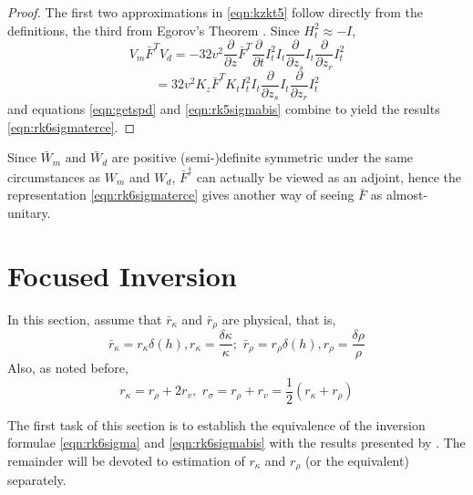 \begin{proof}
The first two approximations in \ref{eqn:kzkt5} follow directly from
the definitions, the third from Egorov's Theorem \cite[]{Tay:81}.
Since $H_t^2 \approx -I$,  
\[ 
V_m \bar{F}^T V_d =- 32 v^2 \frac{\partial}{\partial z} \bar{F}^T  
\frac{\partial}{\partial t}I_t^2 I_t\frac{\partial}{\partial 
  z_s}I_t\frac{\partial}{\partial z_r}I_t^2  
\]
\begin{equation}
\label{eqn:getspd}
=32 v^2 K_z \bar{F}^T K_t I_t^2 I_t\frac{\partial}{\partial 
  z_s}I_t\frac{\partial}{\partial z_r}I_t^2  
\end{equation} 
and  equations \ref{eqn:getspd} and \ref{eqn:rk5sigmabis} combine to 
yield the results \ref{eqn:rk6sigmaterce}.
\end{proof}

Since $\bar{W}_m$ and $\bar{W}_d$ are positive (semi-)definite
symmetric under the same circumstances as $W_m$ and $W_d$,
$\bar{F}^{\ddagger}$ can actually be viewed as an adjoint, hence
the representation \ref{eqn:rk6sigmaterce} gives another way of seeing
$\bar{F}$ as almost-unitary.

\section{Focused Inversion}
In this section, assume that
$\bar{r}_{\kappa}$ and $\bar{r}_\rho$ are physical,
  that is,
\[
\bar{r}_{\kappa} = r_{\kappa}\delta(h), r_{\kappa} =\frac{\delta
  \kappa}{\kappa}; \,\,
\bar{r}_{\rho} = r_{\rho}\delta(h), r_{\rho}=\frac{\delta \rho}{\rho} 
\]
Also, as noted before,
\[
r_{\kappa} = r_{\rho} + 2 r_{v}, \,\,r_{\sigma} = r_{\rho}+r_{v} =
\frac{1}{2}(r_{\kappa}+r_{\rho})
\]

The first task of this section is to establish the equivalence of the
inversion formulae \ref{eqn:rk6sigma} and \ref{eqn:rk6sigmabis} with the
results presented by \cite{HouSymes:15,HouSymes:17}. The remainder
will be devoted to estimation of $r_{\kappa}$ and $r_{\rho}$ (or the
equivalent) separately.

